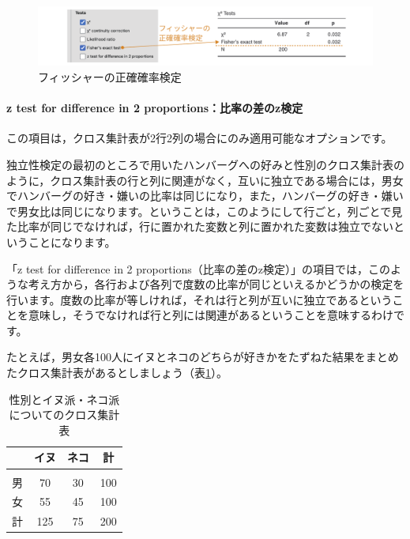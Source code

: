 \documentclass[
  12pt,
  a5jpaper,
  lualatex, ja=standard]{bxjsbook}
\begin{document}
\begin{figure}[!ht]

{\centering \includegraphics[width=1\linewidth]{images/frequencies/chisq-fisher} 

}

\caption{フィッシャーの正確確率検定}\label{fig:frequencies-chisq-fisher}
\end{figure}

\hypertarget{z-test-for-difference-in-2-proportionsux6bd4ux7387ux306eux5deeux306ezux691cux5b9a}{%
\paragraph*{z test for difference in 2 proportions：比率の差のz検定}\label{z-test-for-difference-in-2-proportionsux6bd4ux7387ux306eux5deeux306ezux691cux5b9a}}

この項目は，クロス集計表が2行2列の場合にのみ適用可能なオプションです。

独立性検定の最初のところで用いたハンバーグへの好みと性別のクロス集計表のように，クロス集計表の行と列に関連がなく，互いに独立である場合には，男女でハンバーグの好き・嫌いの比率は同じになり，また，ハンバーグの好き・嫌いで男女比は同じになります。ということは，このようにして行ごと，列ごとで見た比率が同じでなければ，行に置かれた変数と列に置かれた変数は独立でないということになります。

「z test for difference in 2 proportions（比率の差のz検定）」の項目では，このような考え方から，各行および各列で度数の比率が同じといえるかどうかの検定を行います。度数の比率が等しければ，それは行と列が互いに独立であるということを意味し，そうでなければ行と列には関連があるということを意味するわけです。

たとえば，男女各100人にイヌとネコのどちらが好きかをたずねた結果をまとめたクロス集計表があるとしましょう（表\ref{tab:frequencies-chisq-cats-and-dogs}）。

\begin{table}[H]

\caption{\label{tab:frequencies-chisq-cats-and-dogs}性別とイヌ派・ネコ派についてのクロス集計表}
\centering
\begin{tabular}[t]{lccc}
\toprule
  & イヌ & ネコ & 計\\
\midrule
\addlinespace[0.3em]
\multicolumn{4}{l}{\textbf{性別}}\\
\hspace{1em}男 & 70 & 30 & 100\\
\hspace{1em}女 & 55 & 45 & 100\\
計 & 125 & 75 & 200\\
\bottomrule
\end{tabular}
\end{table}
\end{document}
